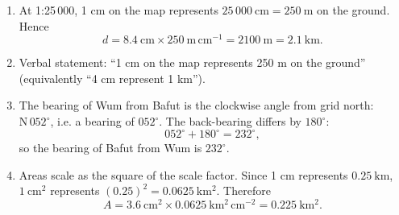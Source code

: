 \documentclass[11pt]{article}
\begin{document}
\begin{corrige}
\begin{enumerate}
\item At 1:25\,000, 1 cm on the map represents $25\,000\ \mathrm{cm} = 250\ \mathrm{m}$ on the ground. Hence
\[ d = 8.4\ \mathrm{cm} \times 250\ \mathrm{m\,cm^{-1}} = 2100\ \mathrm{m} = 2.1\ \mathrm{km}. \]
\item Verbal statement: ``1 cm on the map represents 250 m on the ground'' (equivalently ``4 cm represent 1 km'').
\item The bearing of Wum from Bafut is the clockwise angle from grid north: $\mathrm{N}\,052^{\circ}$, i.e. a bearing of $052^{\circ}$. The back-bearing differs by $180^{\circ}$:
\[ 052^{\circ} + 180^{\circ} = 232^{\circ}, \]
so the bearing of Bafut from Wum is $232^{\circ}$.
\item Areas scale as the square of the scale factor. Since 1 cm represents $0.25\ \mathrm{km}$, $1\ \mathrm{cm^{2}}$ represents $(0.25)^{2} = 0.0625\ \mathrm{km^{2}}$. Therefore
\[ A = 3.6\ \mathrm{cm^{2}} \times 0.0625\ \mathrm{km^{2}\,cm^{-2}} = 0.225\ \mathrm{km^{2}}. \]
\end{enumerate}
\end{corrige}
\end{document}
